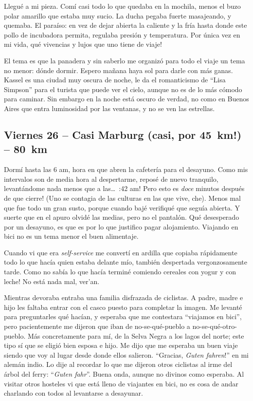 Llegu\'e a mi pieza. Com\'i casi todo lo que quedaba en la mochila, menos el
buzo polar amarillo que estaba muy sucio. La ducha pegaba fuerte
masajeando, y quemaba. El para\'iso: en vez de dejar abierta la caliente y la
fr\'ia hasta donde este pollo de incubadora permita, regulaba presi\'on y
temperatura. \textexclamdown Por \'unica vez en mi vida, qu\'e vivencias y
lujos que uno tiene de viaje!

El tema es que la panadera y sin saberlo me organiz\'o para todo el viaje un
tema no menor: d\'onde dormir. Espero ma\~nana haya sol para darle con m\'as
ganas.\\

Kassel es una ciudad muy oscura de noche, le da el romanticismo de ``Lisa
Simpson'' para el turista que puede ver el cielo, aunque no es de lo m\'as
c\'omodo para caminar. Sin embargo en la noche est\'a oscuro de verdad, no
como en Buenos Aires que entra luminosidad por las ventanas, y no se ven las
estrellas.

\subsection*{Viernes 26 -- Casi Marburg (casi, \textexclamdown por 45~km!) --
80~km}

Dorm\'i hasta las 6 am, hora en que abren la cafeter\'ia para el desayuno.
Como mis intervalos son de media hora al despertarme, repos\'e de nuevo
tranquilo, levant\'andome nada menos que a las\ldots\ :42 am!
\textexclamdown Pero esto es \emph{doce} minutos despu\'es de que cierre! (Uno
se contagia de las culturas en las que vive, che). Menos mal que fue todo un
gran susto, porque cuando baj\'e verifiqu\'e que segu\'ia abierta. Y suerte que
en el apuro olvid\'e las medias, pero no el pantal\'on. Qu\'e desesperado por un
desayuno, es que es por lo que justifico pagar alojamiento. Viajando en bici no
es un tema menor el buen alimentaje.

Cuando vi que era \emph{self-service} me convert\'i en ardilla que copiaba
r\'apidamente todo lo que hac\'ia quien estaba delante m\'io, tambi\'en
despertada vergonzosamente tarde. \textexclamdown Como no sab\'ia lo que
hac\'ia termin\'e comiendo cereales con yogur y con leche! No est\'a nada mal,
ver'an.

Mientras devoraba entraba una familia disfrazada de ciclistas. A padre, madre
e hijo les faltaba entrar con el casco puesto para completar la imagen. Me
levant\'e para preguntarles qu\'e hac\'ian, y esperaba que me contestara
``viajamos en bici'', pero pacientemente me dijeron que iban de
no-se-qu\'e-pueblo a no-se-qu\'e-otro-pueblo. M\'as concretamente para m\'i,
de la Selva Negra a los lagos del norte; este tipo s\'i que se eligi\'o bien
esposa e hijo. Me dijo que me esperaba un buen viaje siendo que voy al lugar
desde donde ellos salieron. ``Gracias, \emph{Guten fahren}!'' en mi alem\'an
indio. Lo dije al recordar lo que me dijeron otros ciclistas al irme del
\'arbol del ferry: ``\emph{Guten fahr}''. Buena onda, aunque no divinos como
esperaba. Al visitar otros hosteles vi que est\'a lleno de viajantes en bici,
no es cosa de andar charlando con todos al levantarse a desayunar.


